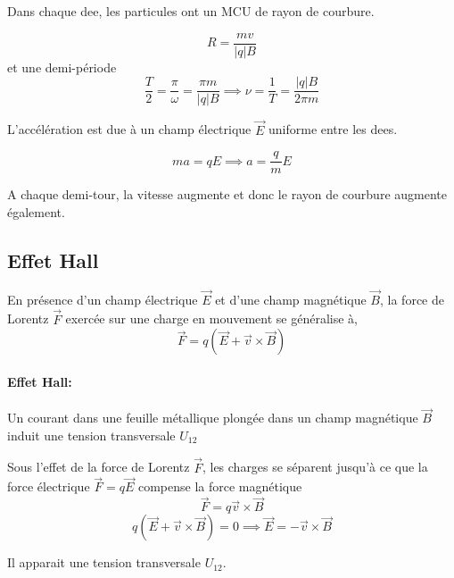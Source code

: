 \documentclass[
    11pt,
    a4paper,
    oneside,
    headinlcude, footinclude,
    twoside,
]{report}
\renewcommand{\vec}[1]{\overrightarrow{#1}}
\begin{document}
Dans chaque dee, les particules ont un MCU de rayon de courbure.

\begin{equation}
    \label{eq:9.5} 
    R = \frac{mv}{|q| B}
\end{equation}
et une demi-période
\begin{equation}
    \frac{T}{2}  = \frac{\pi}{\omega} = \frac{\pi m}{|q| B} \implies \nu = \frac{1}{T}
    = \frac{|q| B}{2\pi m} 
\end{equation}

L'accélération est due à un champ électrique $\vec E$ uniforme entre les dees.

\begin{equation}
    \label{eq:9.6} 
    ma  = q E \implies a = \frac{q}{m} E
\end{equation}

A chaque demi-tour, la vitesse augmente et donc le rayon de courbure augmente
également.

\subsection{Effet Hall}
\label{sub:effet_hall}

En présence d'un champ électrique $\vec E$ et d'une champ magnétique $\vec B$,
la force de Lorentz $\vec F$ exercée sur une charge en mouvement se généralise
à,
\begin{equation}
    \label{eq:9.7} 
    \vec F = q \left(\vec E + \vec v \times \vec B\right)
\end{equation}

\paragraph{Effet Hall:}
\label{par:effet_hall_}

Un courant dans une feuille métallique plongée dans un champ magnétique $\vec B$
induit une tension transversale $U_{12}$

\begin{center}
    \begin{minipage}{.5\linewidth}
        \resizebox{\textwidth}{!}{
        }
    \end{minipage}
    \begin{minipage}{.49\linewidth}
        \setlength{\parskip}{.3em}
        Sous l'effet de la force de Lorentz $\vec F$, les charges se séparent
        jusqu'à ce que la force électrique $\vec F = q  \vec E$ compense la
        force magnétique  
        $$\vec F = q \vec v \times \vec B$$
        $$q(\vec E + \vec v \times \vec B) = 0 \implies \vec E = -\vec v \times
        \vec B$$

        Il apparait une tension transversale $U_{12}$.
    \end{minipage}
\end{center}
\end{document}
